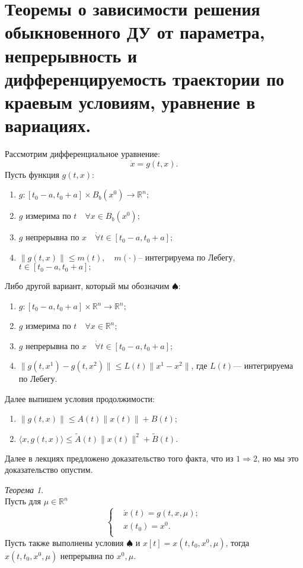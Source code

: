 \documentclass[oneside, final, 14pt, draft]{article}
\theoremstyle{definition}
\theoremstyle{definition}
\theoremstyle{remark}
\theoremstyle{theorem}
\newtheorem{thm}{Теорема}[section]
\renewcommand{\leq}{\leqslant}
\begin{document}
\section{Теоремы о зависимости решения обыкновенного ДУ от параметра, непрерывность и дифференцируемость траектории по краевым условиям, уравнение в вариациях.}
Рассмотрим дифференциальное уравнение:
\begin{equation}
 \dot{x} = g(t, x).
 \label{DifEq}
\end{equation}
Пусть функция $g(t, x):$
\begin{enumerate}
\item $g: [t_0 - a, t_0+a] \times B_b (x^0) \rightarrow \mathbb{R}^n;$
\item $g$ измерима по $t \quad \forall x \in B_b (x^0);$
\item $g$ непрерывна по $x \quad \dot{\forall}t \in [t_0 - a, t_0+a];$
\item $\| g(t, x)\| \leq m(t), \quad m(\cdot)$-- интегрируема по Лебегу, $t \in [t_0 - a, t_0+a];$
\end{enumerate}
Либо другой вариант, который мы обозначим $\spadesuit$:
\begin{enumerate}
\item $g: [t_0 - a, t_0+a] \times \mathbb{R}^n \rightarrow \mathbb{R}^n;$
\item $g$ измерима по $t \quad \forall x \in \mathbb{R}^n;$
\item $g$ непрерывна по $x \quad \dot{\forall} t \in [t_0 - a, t_0+a];$
\item $\| g(t, x^1) - g(t, x^2)\| \leq L(t) \|x^1 - x^2\|$, где $L(t)$--- интегрируема по Лебегу.
\end{enumerate}
Далее выпишем условия продолжимости:
\begin{enumerate}
\item $\| g(t, x)\| \leq A(t)\|x(t)\| + B(t);$
\item $\langle x, g(t, x) \rangle \leq \widetilde{A}(t)\|x(t)\|^2 + \widetilde{B}(t).$
\end{enumerate}
Далее в лекциях предложено доказательство того факта, что из $1 \Rightarrow 2$, но мы это доказательство опустим.
\begin{thm} \ \\
Пусть для $\mu \in \mathbb{R}^n$
$$
\left\{
\begin{aligned}
    &\dot{x}(t)=g(t, x, \mu);\\
    &x(t_0) = x^0.\\
\end{aligned}
\right.
$$
Пусть также выполнены условия $\spadesuit$ и $x[t] = x(t, t_0, x^0, \mu)$, тогда $x(t, t_0, x^0, \mu)$ непрерывна по $x^0, \mu$.
\end{thm}
\end{document}
